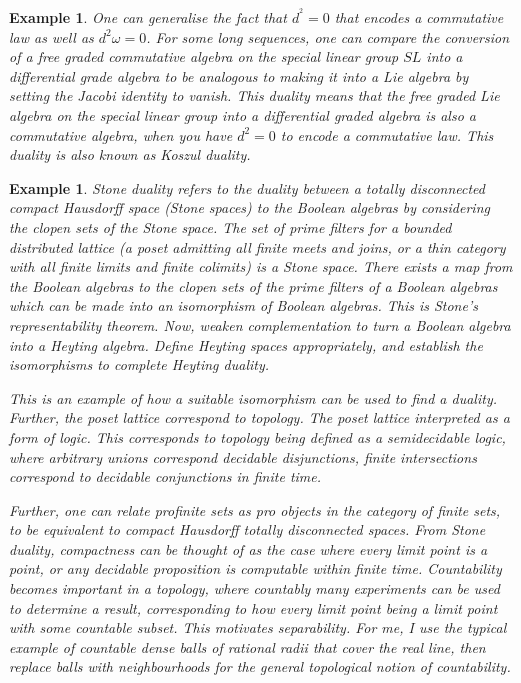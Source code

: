 \documentclass{tufte-book}
\newtheorem{example}[theorem]{Example}
\begin{document}
 \begin{example}
 	One can generalise the fact that $d^^2 = 0$ that encodes a commutative law as well as $d^2 \omega = 0$. For some long sequences, one can compare the conversion of a free graded commutative algebra on the special linear group $SL$ into a differential grade algebra to be analogous to making it into a Lie algebra by setting the Jacobi identity to vanish. This duality means that the free graded Lie algebra on the special linear group into a differential graded algebra is also a commutative algebra, when you have $d^2 = 0$ to encode a commutative law. This duality is also known as Koszul duality.
 \end{example}
 
 \begin{example}
 	Stone duality refers to the duality between a totally disconnected compact Hausdorff space (Stone spaces) to the Boolean algebras by considering the clopen sets of the Stone space. The set of prime filters for a bounded distributed lattice (a poset admitting all finite meets and joins, or a  thin category with all finite limits and finite colimits) is a Stone space. There exists a map from the Boolean algebras to the clopen sets of the prime filters of a Boolean algebras which can be made into an isomorphism of Boolean algebras.
 	This is Stone's representability theorem. Now, weaken complementation to turn a Boolean algebra into a Heyting algebra. Define Heyting spaces appropriately, and establish the isomorphisms to complete Heyting duality.
 
 	This is an example of how a suitable isomorphism can be used to find a duality. Further, the poset lattice correspond to topology. The poset lattice interpreted as a form of logic. This corresponds to topology being defined as a semidecidable logic, where arbitrary unions correspond decidable disjunctions, finite intersections correspond to decidable conjunctions in finite time.
 
 	Further, one can relate profinite sets as pro objects in the category of finite sets, to be equivalent to compact Hausdorff totally disconnected spaces. From Stone duality, compactness can be thought of as the case where every limit point is a point, or any decidable proposition is computable within finite time. Countability becomes important in a topology, where countably many experiments can be used to determine a result, corresponding to how every limit point being a limit point with some countable subset. This motivates separability. For me, I use the typical example of countable dense balls of rational radii that cover the real line, then replace balls with neighbourhoods for the general topological notion of countability.
 \end{example}
 
\end{document}
